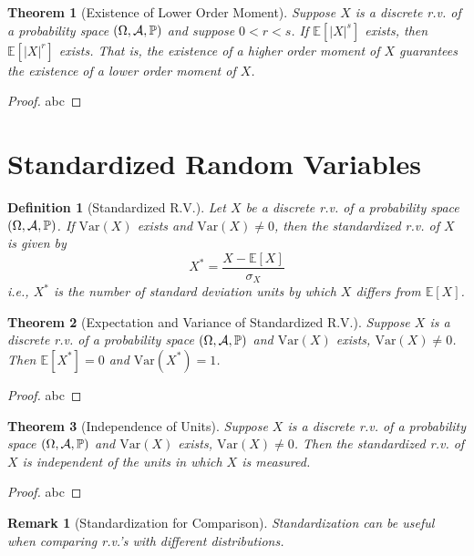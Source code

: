 \documentclass[openany,12pt]{book}
\newtheorem{theorem}{Theorem}[chapter]
\newtheorem{remark}{Remark}[chapter]
\newtheorem{definition}{Definition}[chapter]
\begin{document}
\begin{theorem}[Existence of Lower Order Moment]
  Suppose $X$ is a discrete r.v. of a probability space $(\Omega,\mathcal{A},\mathbb{P})$ and suppose $0<r<s$. If $\mathbb{E}[|X|^s]$ exists, then $\mathbb{E}[|X|^r]$ exists. That is, the existence of a higher order moment of $X$ guarantees the existence of a lower order moment of $X$.
\end{theorem}

\begin{proof}
  abc
\end{proof}

\section{Standardized Random Variables}

\begin{definition}[Standardized R.V.]
  Let $X$ be a discrete r.v. of a probability space $(\Omega,\mathcal{A},\mathbb{P})$. If $\mathrm{Var}(X)$ exists and $\mathrm{Var}(X)\neq0$, then the standardized r.v. of $X$ is given by
  $$X^*=\frac{X-\mathbb{E}[X]}{\sigma_X}$$
  i.e., $X^*$ is the number of standard deviation units by which $X$ differs from $\mathbb{E}[X]$.
\end{definition}

\begin{theorem}[Expectation and Variance of Standardized R.V.]
  Suppose $X$ is a discrete r.v. of a probability space $(\Omega,\mathcal{A},\mathbb{P})$ and $\mathrm{Var}(X)$ exists, $\mathrm{Var}(X)\neq0$. Then $\mathbb{E}[X^*]=0$ and $\mathrm{Var}(X^*)=1$.
\end{theorem}

\begin{proof}
  abc
\end{proof}

\begin{theorem}[Independence of Units]
  Suppose $X$ is a discrete r.v. of a probability space $(\Omega,\mathcal{A},\mathbb{P})$ and $\mathrm{Var}(X)$ exists, $\mathrm{Var}(X)\neq0$. Then the standardized r.v. of $X$ is independent of the units in which $X$ is measured.
\end{theorem}

\begin{proof}
  abc
\end{proof}

\begin{remark}[Standardization for Comparison]
  Standardization can be useful when comparing r.v.'s with different distributions.
\end{remark}
\end{document}

